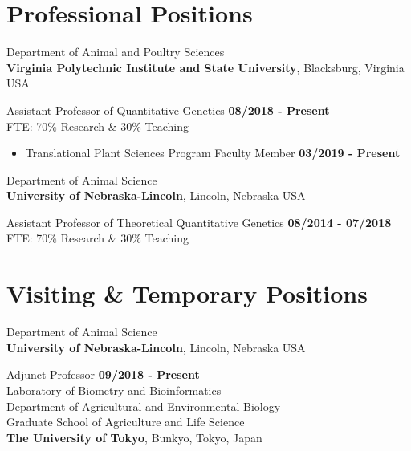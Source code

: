 \documentclass[margin,line,10pt]{res}
\begin{document}
\begin{resume}
\vspace{0.4cm}
\section{\sc Professional Positions}


Department of Animal and Poultry Sciences\\
{\bf Virginia Polytechnic Institute and State University}, Blacksburg, Virginia USA
\vspace{-.3cm}

Assistant Professor of Quantitative Genetics   \hfill {\bf 08/2018 - Present}\\
FTE: 70\% Research \& 30\% Teaching \\

\begin{itemize}
  \item Translational Plant Sciences Program Faculty Member  \hfill {\bf 03/2019 - Present}\\
\end{itemize}

Department of Animal Science\\
{\bf University of Nebraska-Lincoln}, Lincoln, Nebraska USA
\vspace{-.4cm}

Assistant Professor of Theoretical Quantitative Genetics   \hfill {\bf 08/2014 - 07/2018}\\
FTE: 70\% Research \& 30\% Teaching \\



\vspace{0.4cm}
\section{\sc Visiting \& Temporary Positions}
Department of Animal Science\\
{\bf University of Nebraska-Lincoln}, Lincoln, Nebraska USA
\vspace{-.4cm}

Adjunct Professor  \hfill {\bf 09/2018 - Present}\\ 



Laboratory of Biometry and Bioinformatics\\
Department of Agricultural and Environmental Biology \\
Graduate School of Agriculture and Life Science \\
{\bf The University of Tokyo}, Bunkyo, Tokyo, Japan
\vspace{-.3cm}


\end{resume}
\end{document}
